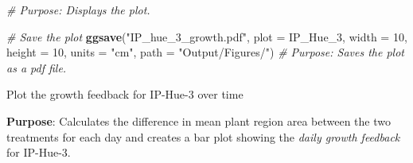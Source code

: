 \documentclass[
  11pt,
]{article}
\newenvironment{Shaded}{\begin{snugshade}}{\end{snugshade}}
\newcommand{\AttributeTok}[1]{\textcolor[rgb]{0.13,0.29,0.53}{#1}}
\newcommand{\CommentTok}[1]{\textcolor[rgb]{0.56,0.35,0.01}{\textit{#1}}}
\newcommand{\DecValTok}[1]{\textcolor[rgb]{0.00,0.00,0.81}{#1}}
\newcommand{\FunctionTok}[1]{\textcolor[rgb]{0.13,0.29,0.53}{\textbf{#1}}}
\newcommand{\NormalTok}[1]{#1}
\newcommand{\StringTok}[1]{\textcolor[rgb]{0.31,0.60,0.02}{#1}}
\begin{document}
\begin{Shaded}
\begin{Highlighting}[]
\CommentTok{\# Purpose: Displays the plot.}

\CommentTok{\# Save the plot}
\FunctionTok{ggsave}\NormalTok{(}\StringTok{"IP\_hue\_3\_growth.pdf"}\NormalTok{, }\AttributeTok{plot =}\NormalTok{ IP\_Hue\_3, }\AttributeTok{width =} \DecValTok{10}\NormalTok{, }\AttributeTok{height =} \DecValTok{10}\NormalTok{, }\AttributeTok{units =} \StringTok{"cm"}\NormalTok{, }\AttributeTok{path =} \StringTok{"Output/Figures/"}\NormalTok{)}
\CommentTok{\# Purpose: Saves the plot as a pdf file.}
\end{Highlighting}
\end{Shaded}

Plot the growth feedback for IP-Hue-3 over time

\textbf{Purpose}: Calculates the difference in mean plant region area
between the two treatments for each day and creates a bar plot showing
the \emph{daily growth feedback} for IP-Hue-3.
\end{document}
